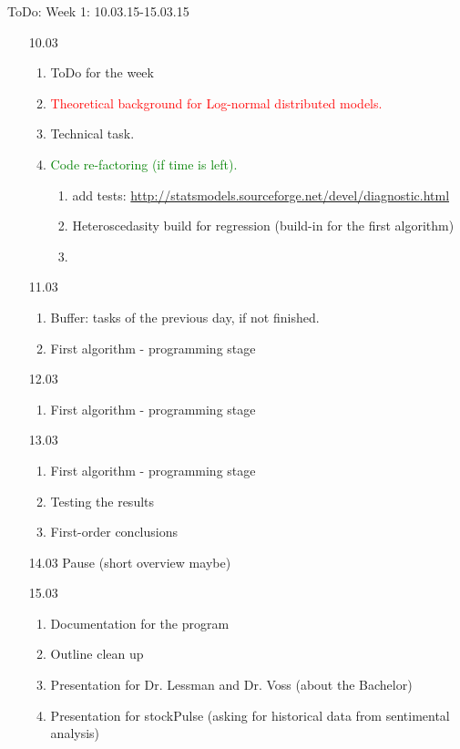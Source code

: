 \documentclass {article}
\begin{document}
ToDo:
Week 1: 10.03.15-15.03.15
\begin{enumerate}
	\item[10.03] 
		\begin{enumerate}
			\item ToDo for the week
			\item \textcolor{red}{Theoretical background for Log-normal distributed models.}
			\item Technical task.
			\item \textcolor{green}{Code re-factoring (if time is left).}
				\begin{enumerate}
					\item add tests: \url{http://statsmodels.sourceforge.net/devel/diagnostic.html}
					\item Heteroscedasity build for regression (build-in for the first algorithm)
					\item 
				\end{enumerate}
		\end{enumerate}
	\item[11.03]
		\begin{enumerate}
			\item Buffer: tasks of the previous day, if not finished.
			\item First algorithm - programming stage
		\end{enumerate}
	\item[12.03]
		\begin{enumerate}
			\item First algorithm - programming stage
		\end{enumerate}
	\item[13.03]
		\begin{enumerate}
			\item First algorithm - programming stage
			\item Testing the results
			\item First-order conclusions
		\end{enumerate}
	\item[14.03] Pause (short overview maybe)
	\item[15.03]
		\begin{enumerate}
			\item Documentation for the program
			\item Outline clean up
			\item Presentation for Dr. Lessman and Dr. Voss (about the Bachelor)
			\item Presentation for stockPulse (asking for historical data from sentimental analysis)
		\end{enumerate}
\end{enumerate}
\end{document}
